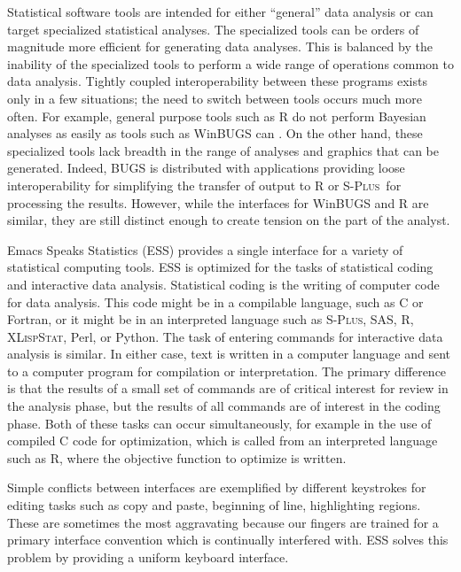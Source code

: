 \documentclass{article}
\newcommand*{\Splus}{\textsc{S-Plus}}
\newcommand*{\XLispStat}{\textsc{XLispStat}}
\begin{document}
Statistical software tools are intended for either ``general'' data
analysis or can target specialized statistical analyses.  The
specialized tools can be orders of magnitude more efficient for
generating data analyses.  This is balanced by the inability of the
specialized tools to perform a wide range of operations common to data
analysis.  Tightly coupled interoperability between these programs
exists only in a few situations; the need to switch between tools
occurs much more often.  For example, general purpose tools such as R
\citep{ihak:gent:1996} do not perform Bayesian analyses as easily as
tools such as WinBUGS can \citep{SpieThomBest:1999}.  On the other
hand, these specialized tools lack breadth in the range of analyses
and graphics that can be generated.  Indeed, BUGS is distributed with
applications providing loose interoperability for simplifying the
transfer of output to R or \Splus\ for processing the results.
However, while the interfaces for WinBUGS and R are similar, they are
still distinct enough to create tension on the part of the analyst.

Emacs Speaks Statistics (ESS) \citep{ESS} provides a single 
interface for a variety of statistical computing tools.  ESS is
optimized for the tasks of statistical coding and interactive data
analysis.  Statistical coding is the writing of computer code for data
analysis.  This code might be in a compilable language, such as C or
Fortran, or it might be in an interpreted language such as \Splus,
SAS, R, \XLispStat, Perl, or Python.  The task of entering commands
for interactive data analysis is similar.  In either case, text is
written in a computer language and sent to a computer program for
compilation or interpretation.  The primary difference is that the
results of a small set of commands are of critical interest for review
in the analysis phase, but the results of all commands are of interest
in the coding phase.  Both of these tasks can occur simultaneously,
for example in the use of compiled C code for optimization, which is
called from an interpreted language such as R, where the objective
function to optimize is written.

Simple conflicts between interfaces are exemplified by different
keystrokes for editing tasks such as copy and paste, beginning of
line, highlighting regions.  These are sometimes the most aggravating
because our fingers are trained for a primary interface convention
which is continually interfered with.  ESS solves this problem by
providing a uniform keyboard interface.
\end{document}
